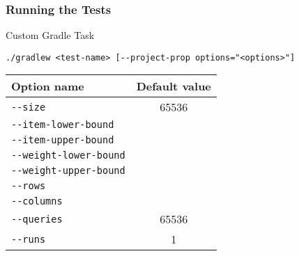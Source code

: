 \documentclass{beamer}
\begin{document}
\begin{frame}
  \frametitle{Running the Tests}

  \begin{block}{Custom Gradle Task}
    \begin{center}
      \lstinline{./gradlew <test-name> [--project-prop options="<options>"]}
    \end{center}

    \begin{table}
      \centering
      \begin{tabular}{
        l
        S[
          table-alignment = right,
          table-format = 5,
        ]
      }
        \toprule
        Option name & {Default value} \\
        \midrule
        \lstinline{--size} & 65536 \\
        \lstinline{--item-lower-bound} & \\
        \lstinline{--item-upper-bound} & \\
        \lstinline{--weight-lower-bound} & \\
        \lstinline{--weight-upper-bound} & \\
        \lstinline{--rows} & \\
        \lstinline{--columns} & \\
        \lstinline{--queries} & 65536 \\
        \lstinline{--runs} & 1 \\
        \bottomrule
      \end{tabular}
    \end{table}
  \end{block}
\end{frame}
\end{document}
